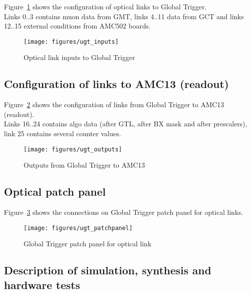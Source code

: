Figure~\ref{fig:app:ugt_inputs} shows the configuration of optical links to Global Trigger.\\
Links 0..3 contains muon data from GMT, links 4..11 data from GCT and links 12..15 external conditions
from AMC502 boards.

\begin{figure}[htb]
\centering
\texttt{[image: figures/ugt\_inputs]}
\caption{Optical link inputs to Global Trigger}
\label{fig:app:ugt_inputs}
\end{figure}

\subsection{Configuration of links to AMC13 (readout)}\label{sec:app:app_c}

Figure~\ref{fig:app:ugt_outputs} shows the configuration of links from Global Trigger to AMC13 (readout).\\
Links 16..24 contains algo data (after GTL, after BX mask and after prescalers), link 25 contains several counter values.

\begin{figure}[htb]
\centering
\texttt{[image: figures/ugt\_outputs]}
\caption{Outputs from Global Trigger to AMC13}
\label{fig:app:ugt_outputs}
\end{figure}

\clearpage

\subsection{Optical patch panel}\label{sec:app:app_d}

Figure~\ref{fig:app:ugt_pp} shows the connections on Global Trigger patch panel for optical links.

\begin{figure}[htb]
\centering
\texttt{[image: figures/ugt\_patchpanel]}
\caption{Global Trigger patch panel for optical link}
\label{fig:app:ugt_pp}
\end{figure}

\subsection{Description of simulation, synthesis and hardware tests}\label{sec:app:app_e}

